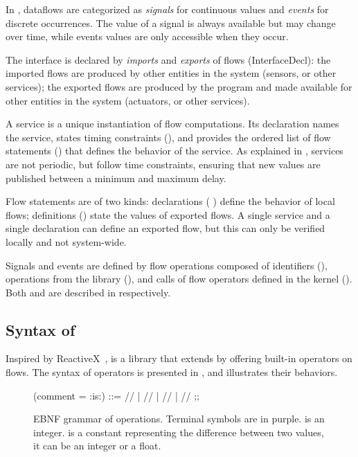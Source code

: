 In \GRFRP, dataflows are categorized as \emph{signals} for continuous values and \emph{events} for
discrete occurrences. The value of a signal is always available but may change over time, while
events values are only accessible when they occur.

The interface is declared by \emph{imports} and \emph{exports} of flows (InterfaceDecl):
the imported flows are produced by other entities in the system (sensors, or other services);
the exported flows are produced by the program and made available for other entities in the system
(actuators, or other services).

A service is a unique instantiation of flow computations. Its declaration names the service, states
timing constraints (\interval{\INT}{\INT}), and provides the ordered list of flow
statements (\block{\many{\FlowStmt}}) that defines the behavior of the service. As explained in
, services are not periodic, but follow time constraints, ensuring that new
values are published between a minimum and maximum delay.

Flow statements are of two kinds: declarations (
{\FlowOp}) define the behavior of local flows; definitions () state
the values of exported flows. A single service and a single declaration can define an exported flow,
but this can only be verified locally and not system-wide.

Signals and events are defined by flow operations composed of identifiers (\ID), operations from
the \GReact library (\GReactExpr), and calls of flow operators defined in the \GRSync kernel
(\compApp{\ID}{\many{\FlowOp}}). Both \GReact and \GRSync are described in
 respectively.

\subsection{Syntax of \GReact}
\label{sec:grust:syntax:greact}

Inspired by ReactiveX~\cite{reactivex}, \GReact is a library that extends \GRFRP by offering
built-in operators on flows. The syntax of \GReact operators is presented in
, and  illustrates their behaviors.

\begin{figure}[!ht]
    \centering
    \begin{bnf}(comment = {:is:})
        \GReactExpr ::= \onchangeExpr{\FlowOp} //  \persistExpr{\FlowOp}
        | \scanExpr{\FlowOp}{\INT} // \sampleExpr{\FlowOp}{\INT}
        | \timeoutExpr{\FlowOp}{\INT} // \mergeExpr{\FlowOp}{\FlowOp}
        | \throttleExpr{\FlowOp}{\DELTA} // \timeExpr ;;
    \end{bnf}
    \caption[EBNF grammar of \GReact operations.]
    {EBNF grammar of \GReact operations.
        Terminal symbols are in purple.
        \INT is an integer.
        \DELTA is a constant representing the difference between two values, it can be an integer or
        a float.
    }
    \label{fig:syntax:greact}
\end{figure}

